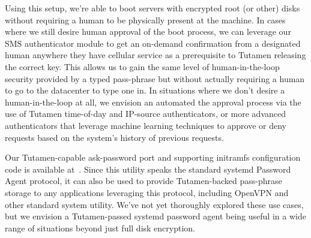 Using this setup, we're able to boot servers with encrypted root (or
other) disks without requiring a human to be physically present at the
machine. In cases where we still desire human approval of the boot
process, we can leverage our SMS authenticator module to get an
on-demand confirmation from a designated human anywhere they have
cellular service as a prerequisite to Tutamen releasing the correct
key. This allows us to gain the same level of human-in-the-loop
security provided by a typed pass-phrase but without actually
requiring a human to go to the datacenter to type one in. In
situations where we don't desire a human-in-the-loop at all, we
envision an automated the approval process via the use of Tutamen
time-of-day and IP-source authenticators, or more advanced
authenticators that leverage machine learning techniques to approve or
deny requests based on the system's history of previous requests.

Our Tutamen-capable ask-password port and supporting initramfs
configuration code is available
at~\cite{src-tutamen-askpassword}. Since this utility speaks the
standard systemd Password Agent protocol, it can also be used to
provide Tutamen-backed pass-phrase storage to any applications
leveraging this protocol, including OpenVPN and other standard system
utility. We've not yet thoroughly explored these use cases, but we
envision a Tutamen-passed systemd password agent being useful in a
wide range of situations beyond just full disk encryption.




